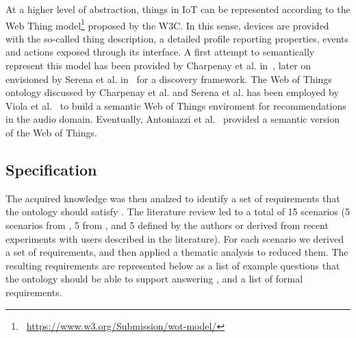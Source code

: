 At a higher level of abstraction, things in IoT can be represented according to the Web Thing model\footnote{\faLink~\url{https://www.w3.org/Submission/wot-model/}} proposed by the W3C. In this sense, devices are provided with the so-called thing description, a detailed profile reporting properties, events and actions exposed through its interface. A first attempt to semantically represent this model has been provided by Charpenay et al. in~\cite{charpenay2016introducing}, later on envisioned by Serena et al. in~\cite{serena2018discovery} for a discovery framework. The Web of Things ontology discussed by Charpenay et al. and Serena et al. has been employed by Viola et al.~\cite{viola2018playsound} to build a semantic Web of Things enviroment for recommendations in the audio domain. Eventually, Antoniazzi et al.~\mbox{\cite{antoniazzi2019building}} provided a semantic version of the Web of Things.

\subsection{Specification}
\label{ssec:specification}
The acquired knowledge was then analzed to identify a set of requirements that the ontology should satisfy \cite{siegemund2011towards}. The literature review led to a total of 15 scenarios (5 scenarios from \cite{turchet2018IoMusT}, 5 from \cite{turchet2019SMI}, and 5 defined by the authors or derived from recent experiments with users described in the literature). For each scenario we derived a set of requirements, and then applied a thematic analysis \cite{BraCla06} to reduced them. The resulting requirements are represented below as a list of example questions that the ontology should be able to support answering \cite{gruninger1995methodology}, and a list of formal requirements.


